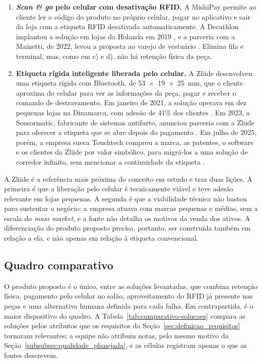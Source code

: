 \begin{enumerate}[label=\alph*)]
  \item \textbf{\textit{Scan \& go} pelo celular com desativação RFID.} A MishiPay permite ao cliente ler o código do produto no próprio celular, pagar no aplicativo e sair da loja com a etiqueta RFID desativada automaticamente. A Decathlon implantou a solução em lojas da Holanda em 2019 \cite{retailsystems2019}, e a parceria com a Mainetti, de 2022, levou a proposta ao varejo de vestuário \cite{fashionnetwork2022}. Elimina fila e terminal, mas, como em c) e d), não há retenção física da peça.

  \item \textbf{Etiqueta rígida inteligente liberada pelo celular.} A Zliide desenvolveu uma etiqueta rígida com Bluetooth, de 53~$\times$~19~$\times$~25~mm, que o cliente aproxima do celular para ver as informações da peça, pagar e receber o comando de destravamento. Em janeiro de 2021, a solução operava em dez pequenas lojas na Dinamarca, com adesão de 41\% dos clientes \cite{swedberg2021}. Em 2023, a Sensormatic, fabricante de sistemas antifurto, anunciou parceria com a Zliide para oferecer a etiqueta que se abre depois do pagamento \cite{sensormatic2023zliide}. Em julho de 2025, porém, a empresa sueca Touchtech comprou a marca, as patentes, o software e os clientes da Zliide por valor simbólico, para migrá-los a uma solução de corredor infinito, sem mencionar a continuidade da etiqueta \cite{touchtech2025}.
\end{enumerate}

A Zliide é a referência mais próxima do conceito em estudo e traz duas lições. A primeira é que a liberação pelo celular é tecnicamente viável e teve adesão relevante em lojas pequenas. A segunda é que a viabilidade técnica não bastou para sustentar o negócio: a empresa atuava com marcas pequenas e médias, sem a escala do \textit{mass market}, e a fonte não detalha os motivos da venda dos ativos. A diferenciação do produto proposto precisa, portanto, ser construída também em relação a ela, e não apenas em relação à etiqueta convencional.

\subsection{Quadro comparativo}
\label{sec:quadro-comparativo}

O produto proposto é o único, entre as soluções levantadas, que combina retenção física, pagamento pelo celular no salão, aproveitamento do RFID já presente nas peças e uma alternativa humana definida para cada falha. Em contrapartida, é o maior dispositivo do quadro. A Tabela~\ref{tab:comparativo-solucoes} compara as soluções pelos atributos que os requisitos da Seção~\ref{sec:definicao_requisitos} tornaram relevantes; a equipe não atribuiu notas, pelo mesmo motivo da Seção~\ref{subsubsec:qualidade_planejada}, e as células registram apenas o que as fontes descrevem.

